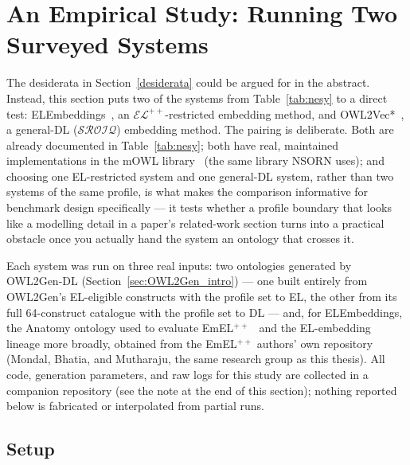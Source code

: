 \section{An Empirical Study: Running Two Surveyed Systems}
\label{study}

The desiderata in Section~\ref{desiderata} could be argued for in the abstract. Instead, this section puts two of the systems from Table~\ref{tab:nesy} to a direct test: ELEmbeddings~\cite{ELEm}, an $\mathcal{EL}^{++}$-restricted embedding method, and OWL2Vec*~\cite{owl2vecstar}, a general-DL ($\mathcal{SROIQ}$) embedding method. The pairing is deliberate. Both are already documented in Table~\ref{tab:nesy}; both have real, maintained implementations in the mOWL library~\cite{mowl} (the same library NSORN uses); and choosing one EL-restricted system and one general-DL system, rather than two systems of the same profile, is what makes the comparison informative for benchmark design specifically — it tests whether a profile boundary that looks like a modelling detail in a paper's related-work section turns into a practical obstacle once you actually hand the system an ontology that crosses it.

Each system was run on three real inputs: two ontologies generated by OWL2Gen-DL (Section~\ref{sec:OWL2Gen_intro}) — one built entirely from OWL2Gen's EL-eligible constructs with the profile set to EL, the other from its full 64-construct catalogue with the profile set to DL — and, for ELEmbeddings, the Anatomy ontology used to evaluate EmEL$^{++}$~\cite{Mondal} and the EL-embedding lineage more broadly, obtained from the EmEL$^{++}$ authors' own repository (Mondal, Bhatia, and Mutharaju, the same research group as this thesis). All code, generation parameters, and raw logs for this study are collected in a companion repository (see the note at the end of this section); nothing reported below is fabricated or interpolated from partial runs.

\subsection{Setup}

